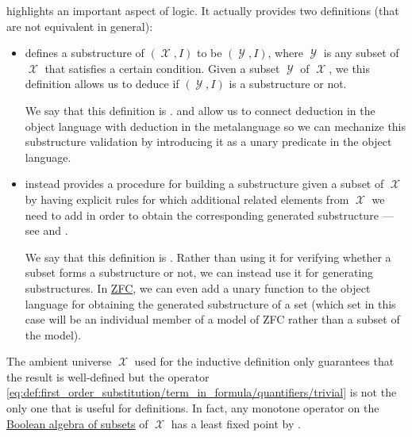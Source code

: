 \begin{remark}\label{rem:induction}
   highlights an important aspect of logic. It actually provides two definitions (that are not equivalent in general):
  \begin{itemize}
    \item {} defines a substructure of \( (\mscrX, I) \) to be \( (\mscrY, I) \), where \( \mscrY \) is any subset of \( \mscrX \) that satisfies a certain condition. Given a subset \( \mscrY \) of \( \mscrX \), we this definition allows us to deduce if \( (\mscrY, I) \) is a substructure or not.

    We say that this definition is .  and  allow us to connect deduction in the object language with deduction in the metalanguage so we can mechanize this substructure validation by introducing it as a unary predicate in the object language.

    \item {} instead provides a procedure for building a substructure given a subset of \( \mscrX \) by having explicit rules for which additional related elements from \( \mscrX \) we need to add in order to obtain the corresponding generated substructure --- see  and .

    We say that this definition is . Rather than using it for verifying whether a subset forms a substructure or not, we can instead use it for generating substructures. In \hyperref[def:zfc]{ZFC}, we can even add a unary function to the object language for obtaining the generated substructure of a set (which set in this case will be an individual member of a model of ZFC rather than a subset of the model).
  \end{itemize}

  The ambient universe \( \mscrX \) used for the inductive definition only guarantees that the result is well-defined but the operator \eqref{eq:def:first_order_substitution/term_in_formula/quantifiers/trivial} is not the only one that is useful for definitions. In fact, any monotone operator on the \hyperref[thm:subsets_form_boolean_algebra]{Boolean algebra of subsets} of \( \mscrX \) has a least fixed point by .


\end{remark}
